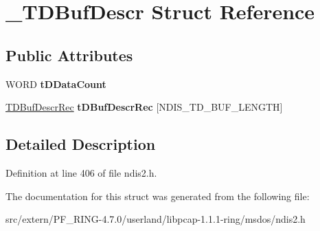 \hypertarget{struct___t_d_buf_descr}{
\section{\_\-TDBufDescr Struct Reference}
\label{struct___t_d_buf_descr}
}
\subsection*{Public Attributes}
\begin{DoxyCompactItemize}
\item 
\hypertarget{struct___t_d_buf_descr_af830034a3664bf4823d2d5834c95b10a}{
WORD {\bfseries tDDataCount}}
\label{struct___t_d_buf_descr_af830034a3664bf4823d2d5834c95b10a}

\item 
\hypertarget{struct___t_d_buf_descr_aceb79a07354a5d06c500e3b6ec9bfd4b}{
\hyperlink{struct___t_d_buf_descr_rec}{TDBufDescrRec} {\bfseries tDBufDescrRec} \mbox{[}NDIS\_\-TD\_\-BUF\_\-LENGTH\mbox{]}}
\label{struct___t_d_buf_descr_aceb79a07354a5d06c500e3b6ec9bfd4b}

\end{DoxyCompactItemize}


\subsection{Detailed Description}


Definition at line 406 of file ndis2.h.



The documentation for this struct was generated from the following file:\begin{DoxyCompactItemize}
\item 
src/extern/PF\_\-RING-\/4.7.0/userland/libpcap-\/1.1.1-\/ring/msdos/ndis2.h\end{DoxyCompactItemize}

